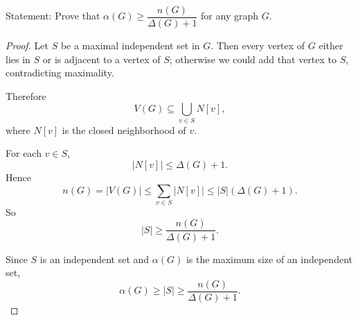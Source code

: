 \documentclass[11pt]{article}
\begin{document}
Statement: {Prove that $\alpha(G)\ge \dfrac{n(G)}{\Delta(G)+1}$ for any graph $G$.}

\begin{proof}
Let $S$ be a maximal independent set in $G$. Then every vertex of $G$ either lies in $S$ or is adjacent to a vertex of $S$; otherwise we could add that vertex to $S$, contradicting maximality.

Therefore
\[
V(G)\subseteq \bigcup_{v\in S} N[v],
\]
where $N[v]$ is the closed neighborhood of $v$.

For each $v\in S$,
\[
|N[v]|\le \Delta(G)+1.
\]
Hence
\[
n(G)=|V(G)|
\le \sum_{v\in S}|N[v]|
\le |S|(\Delta(G)+1).
\]
So
\[
|S|\ge \frac{n(G)}{\Delta(G)+1}.
\]

Since $S$ is an independent set and $\alpha(G)$ is the maximum size of an independent set,
\[
\alpha(G)\ge |S|\ge \frac{n(G)}{\Delta(G)+1}.
\]
\end{proof}
\end{document}
